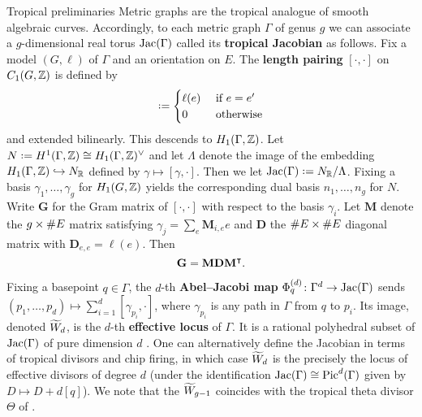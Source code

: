 \documentclass[final]{beamer}
\newcommand*{\defn}[1]{\textbf{#1}}
\newlength{\colwidth}
\begin{document}
\begin{frame}[t]
\begin{columns}[t]
\begin{column}{\colwidth}
\begin{block}{Tropical preliminaries}
Metric graphs are the tropical analogue of smooth algebraic curves.  Accordingly, to each metric graph $\Gamma$ of genus $g$ we can associate a $g$-dimensional real torus $\operatorname{Jac}(\Gamma)$ called its \defn{tropical Jacobian} as follows.  Fix a model $(G,\ell)$ of $\Gamma$ and an orientation on $E$.  The \defn{length pairing} $[\cdot,\cdot]$ on $C_{1}(G,\mathbb{Z})$ is defined by
\begin{equation}
  [e, e'] \defeq
  \begin{cases}
    \ell(e) &\text{ if } e = e'  \\
    0 &\text{ otherwise}
  \end{cases}
\end{equation}
and extended bilinearly.  This descends to $H_1(\Gamma,\mathbb{Z})$.  Let $N \defeq H^1(\Gamma,\ZZ) \cong H_1(\Gamma,\ZZ)^{\vee}$ and let $\Lambda$ denote the image of the embedding $H_{1}(\Gamma,\mathbb{Z}) \hookrightarrow N_{\mathbb{R}}$ defined by $\gamma \mapsto [\gamma,\cdot]$.  Then we let $\Jac(\Gamma) \defeq N_{\RR}/\Lambda$.  Fixing a basis $\gamma_1,\ldots,\gamma_g$ for $H_1(G,\mathbb{Z})$ yields the corresponding dual basis $n_{1},\ldots,n_{g}$ for $N$.  Write $\mathbf{G}$ for the Gram matrix of $[\cdot,\cdot]$ with respect to the basis $\gamma_{i}$.  Let $\mathbf{M}$ denote the $g \times \#{E}$ matrix satisfying $\gamma_{j} = \sum_{e} \mathbf{M}_{i,e}e$ and $\mathbf{D}$ the $\#{E} \times \#{E}$ diagonal matrix with $\mathbf{D}_{e,e} = \ell(e)$.  Then 
\begin{equation}
  \mathbf{G} = \mathbf{M}\mathbf{D}\mathbf{M}^{\intercal}.
\end{equation}

Fixing a basepoint $q \in \Gamma$, the $d$-th \defn{Abel--Jacobi map} $\Phi_{q}^{(d)} \maps \Gamma^{d} \to \Jac(\Gamma)$ sends $(p_{1},\ldots,p_{d}) \mapsto \sum_{i=1}^{d}[\gamma_{p_{i}},\cdot]$, where $\gamma_{p_{i}}$ is any path in $\Gamma$ from $q$ to $p_{i}$.  Its image, denoted $\widetilde W_{d}$, is the $d$-th \defn{effective locus} of $\Gamma$.  It is a rational polyhedral subset of $\operatorname{Jac}(\Gamma)$ of pure dimension $d$ \cite{gross2022effective}.  One can alternatively define the Jacobian in terms of tropical divisors and chip firing, in which case $\widetilde W_{d}$ is the precisely the locus of effective divisors of degree $d$ (under the identification $\operatorname{Jac}(\Gamma) \cong \operatorname{Pic}^{d}(\Gamma)$ given by $D \mapsto D + d[q]$).  We note that the $\widetilde W_{g-1}$ coincides with the tropical theta divisor $\Theta$ of \cite{gross2023tautological}.
\end{block}
\end{column}


\end{columns}
\end{frame}
\end{document}
